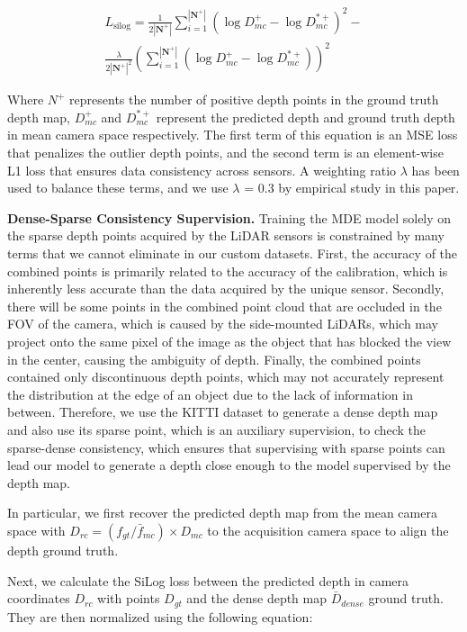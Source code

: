 \documentclass{article}
\begin{document}
\begin{multline}
L_{\text{silog}} = \frac{1}{2|\mathbf{N^+}|} \sum_{i=1}^{|\mathbf{N^+}|} \left( \log D_{mc}^+ - \log D_{mc}^{*+} \right)^2 - \\
\frac{\lambda}{2|\mathbf{N^+}|^2} \left( \sum_{i=1}^{|\mathbf{N^+}|} \left( \log D_{mc}^+ - \log D_{mc}^{*+} \right) \right)^2
\end{multline}

Where \(N^+\) represents the number of positive depth points in the ground truth depth map, \(D_{mc}^{+}\) and \(D_{mc}^{*+}\) represent the predicted depth and ground truth depth in mean camera space respectively. The first term of this equation is an MSE loss that penalizes the outlier depth points, and the second term is an element-wise L1 loss that ensures data consistency across sensors. A weighting ratio \(\lambda\) has been used to balance these terms, and we use \(\lambda\) = 0.3 by empirical study in this paper.

\vspace{10pt}
\noindent \textbf{Dense-Sparse Consistency Supervision.} Training the MDE model solely on the sparse depth points acquired by the LiDAR sensors is constrained by many terms that we cannot eliminate in our custom datasets. First, the accuracy of the combined points is primarily related to the accuracy of the calibration, which is inherently less accurate than the data acquired by the unique sensor. Secondly, there will be some points in the combined point cloud that are occluded in the FOV of the camera, which is caused by the side-mounted LiDARs, which may project onto the same pixel of the image as the object that has blocked the view in the center, causing the ambiguity of depth. Finally, the combined points contained only discontinuous depth points, which may not accurately represent the distribution at the edge of an object due to the lack of information in between. Therefore, we use the KITTI dataset \cite{kittdepthbenchmard,kitti} to generate a dense depth map and also use its sparse point, which is an auxiliary supervision, to check the sparse-dense consistency, which ensures that supervising with sparse points can lead our model to generate a depth close enough to the model supervised by the depth map.

In particular, we first recover the predicted depth map from the mean camera space with \(D_{rc} = ({f_{gt}} / {\bar{f}_{mc}}) \times D_{mc}\) to the acquisition camera space to align the depth ground truth. 

Next, we calculate the SiLog loss between the predicted depth in camera coordinates \(D_{rc}\) with points \(D_{gt}\) and the dense depth map \(\bar{D}_{dense}\) ground truth. They are then normalized using the following equation:
\end{document}
